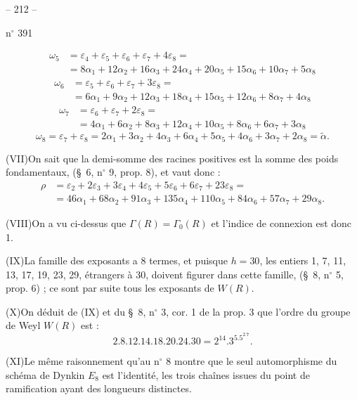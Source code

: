 \begin{center}-- 212 --\end{center}
\hfill n$^\circ$ 391

\[
\begin{aligned}
\omega_5&=\varepsilon_4+\varepsilon_5+\varepsilon_6+\varepsilon_7+4\varepsilon_8=\\
&=8\alpha_1+12\alpha_2+16\alpha_3+24\alpha_4+20\alpha_5+15\alpha_6+10\alpha_7+5\alpha_8
\end{aligned}
\]
\[
\begin{aligned}
\omega_6&=\varepsilon_5+\varepsilon_6+\varepsilon_7+3\varepsilon_8=\\
&=6\alpha_1+9\alpha_2+12\alpha_3+18\alpha_4+15\alpha_5+12\alpha_6+8\alpha_7+4\alpha_8
\end{aligned}
\]
\[
\begin{aligned}
\omega_7&=\varepsilon_6+\varepsilon_7+2\varepsilon_8=\\
&=4\alpha_1+6\alpha_2+8\alpha_3+12\alpha_4+10\alpha_5+8\alpha_6+6\alpha_7+3\alpha_8
\end{aligned}
\]
\[
\omega_8=\varepsilon_7+\varepsilon_8
=2\alpha_1+3\alpha_2+4\alpha_3+6\alpha_4+5\alpha_5+4\alpha_6+3\alpha_7+2\alpha_8
=\tilde\alpha.
\]

(VII)\quad On sait que la demi-somme des racines positives est la somme des
poids fondamentaux, (\S\ 6, n$^\circ$ 9, prop. 8), et vaut donc :
\[
\begin{aligned}
\rho&=\varepsilon_2+2\varepsilon_3+3\varepsilon_4+4\varepsilon_5+
5\varepsilon_6+6\varepsilon_7+23\varepsilon_8=\\
&=46\alpha_1+68\alpha_2+91\alpha_3+135\alpha_4+110\alpha_5+84\alpha_6+57\alpha_7+29\alpha_8.
\end{aligned}
\]

(VIII)\quad On a vu ci-dessus que $\Gamma(R)=\Gamma_0(R)$ et l'indice de connexion
est donc 1.

(IX)\quad La famille des exposants a 8 termes, et puisque $h=30$, les entiers
1, 7, 11, 13, 17, 19, 23, 29, étrangers à 30, doivent figurer dans cette
famille, (\S\ 8, n$^\circ$ 5, prop. 6) ; ce sont par suite tous les exposants de $W(R)$.

(X)\quad On déduit de (IX) et du \S\ 8, n$^\circ$ 3, cor. 1 de la prop. 3 que
l'ordre du groupe de Weyl $W(R)$ est :
\[
2.8.12.14.18.20.24.30=2^{14}.3^5.5^2.7.
\]

(XI)\quad Le même raisonnement qu'au n$^\circ$ 8 montre que le seul automorphisme
du schéma de Dynkin $E_8$ est l'identité, les trois chaînes issues du point de
ramification ayant des longueurs distinctes.
